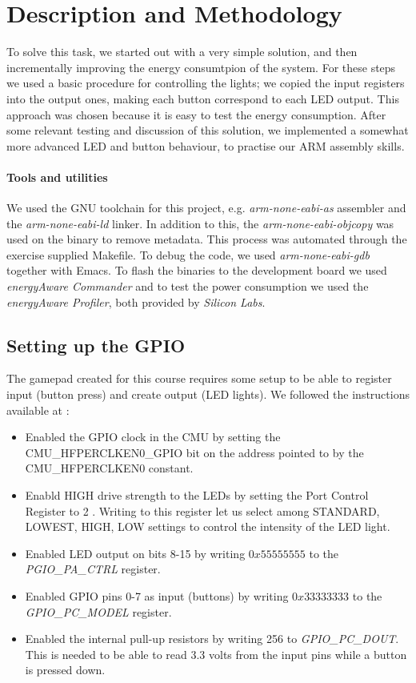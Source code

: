 \section{Description and Methodology}
\label{section:description_and_methodology}
To solve this task, we started out with a very simple solution, and then incrementally improving the energy consumtpion of the system. For these steps we used a basic procedure for controlling the lights; we copied the input registers into the output ones, making each button correspond to each LED output. This approach was chosen because it is easy to test the energy consumption. After some relevant testing and discussion of this solution, we implemented a somewhat more advanced LED and button behaviour, to practise our ARM assembly skills. 

	\paragraph{Tools and utilities}
	We used the GNU toolchain for this project, e.g. \emph{arm-none-eabi-as} assembler and the \emph{arm-none-eabi-ld} linker. In addition to this, the \emph{arm-none-eabi-objcopy} was used on the binary to remove metadata. This process was automated through the exercise supplied Makefile. To debug the code, we used \emph{arm-none-eabi-gdb} together with Emacs. To flash the binaries to the development board we used \emph{energyAware Commander} and to test the power consumption we used the \emph{energyAware Profiler}, both provided by \emph{Silicon Labs}.
	\subsection{Setting up the GPIO}
	\label{subsection:gpio_setup}
	The gamepad created for this course requires some setup to be able to register input (button press) and create output (LED lights). We followed the instructions available at \cite[p. 24]{compendium}:
	
	\begin{itemize}
		\item Enabled the GPIO clock in the CMU by setting the CMU\_HFPERCLKEN0\_GPIO bit on the address pointed to by the CMU\_HFPERCLKEN0 constant.
		\item Enabld HIGH drive strength to the LEDs by setting the Port Control Register to 2 \cite[p. 766]{reference_manual}. Writing to this register let us select among STANDARD, LOWEST, HIGH, LOW settings to control the intensity of the LED light.
		\item Enabled LED output on bits 8-15 by writing $0x55555555$ to the \emph{PGIO\_PA\_CTRL} register.
		\item Enabled GPIO pins 0-7 as input (buttons) by writing $0x33333333$ to the \emph{GPIO\_PC\_MODEL} register.
		\item Enabled the internal pull-up resistors by writing 256 to \emph{GPIO\_PC\_DOUT}. This is needed to be able to read 3.3 volts from the input pins while a button is pressed down.
	\end{itemize}

